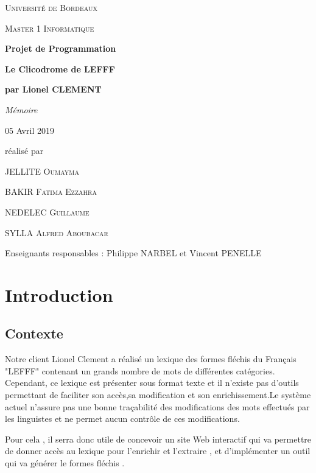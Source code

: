 \documentclass[12pt,a4paper]{article}
\begin{document}
\begin{titlepage}
\centering
{\scshape\LARGE Université de Bordeaux \par}
{\scshape\Large Master 1 Informatique  \par}
\vspace{3cm}

{\Huge\bfseries Projet de Programmation\par}
{\Huge\bfseries Le Clicodrome de LEFFF \par}
{\Large\bfseries par Lionel CLEMENT \par}
\vspace{0.5cm}
{\Large\itshape Mémoire \par}
{\large 05 Avril 2019\par}

\vfill
réalisé par \par
JELLITE \textsc{Oumayma} \par
BAKIR \textsc{Fatima Ezzahra} \par
NEDELEC \textsc{Guillaume} \par
SYLLA  \textsc{Alfred Aboubacar} \par
\vfill

{\large Enseignants responsables : Philippe NARBEL et Vincent PENELLE\par}

\end{titlepage}

\newpage
\tableofcontents
\newpage
\listoffigures

\newpage\section{Introduction}
\subsection{Contexte}

\smallbreak 

Notre client Lionel Clement a réalisé un lexique des formes fléchis du Français "LEFFF"  contenant un grands nombre de mots de différentes catégories. Cependant, ce lexique est présenter sous format texte et il n'existe pas d'outils permettant de faciliter son accès,sa modification et son enrichissement.Le système actuel n'assure pas une bonne traçabilité des modifications des mots effectués par les linguistes et ne permet aucun contrôle de ces modifications.

Pour cela , il serra donc utile de concevoir un site Web interactif qui va permettre de donner accès au lexique pour l'enrichir et l'extraire , et d'implémenter un outil qui va générer le formes fléchis .
\end{document}
